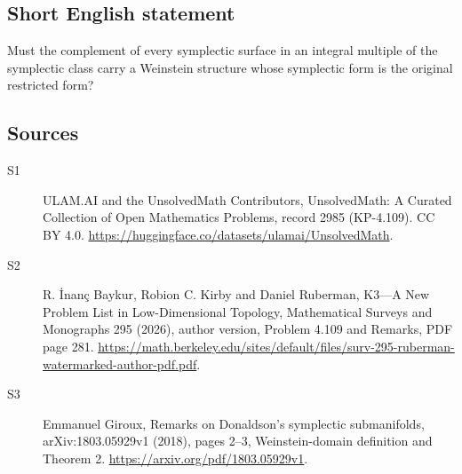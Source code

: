 \documentclass[11pt]{article}
\begin{document}
\subsection{Short English statement}
Must the complement of every symplectic surface in an integral multiple of the symplectic class carry a Weinstein structure whose symplectic form is the original restricted form?
\subsection{Sources}
\begin{description}
\item[\hypertarget{source:2985:1}{S1}] ULAM.AI and the UnsolvedMath Contributors, UnsolvedMath: A Curated Collection of Open Mathematics Problems, record 2985 (KP-4.109). CC BY 4.0. \url{https://huggingface.co/datasets/ulamai/UnsolvedMath}.
\item[\hypertarget{source:2985:2}{S2}] R. İnanç Baykur, Robion C. Kirby and Daniel Ruberman, K3—A New Problem List in Low-Dimensional Topology, Mathematical Surveys and Monographs 295 (2026), author version, Problem 4.109 and Remarks, PDF page 281. \url{https://math.berkeley.edu/sites/default/files/surv-295-ruberman-watermarked-author-pdf.pdf}.
\item[\hypertarget{source:2985:3}{S3}] Emmanuel Giroux, Remarks on Donaldson's symplectic submanifolds, arXiv:1803.05929v1 (2018), pages 2--3, Weinstein-domain definition and Theorem 2. \url{https://arxiv.org/pdf/1803.05929v1}.
\end{description}
\label{end:2985}
\end{document}
